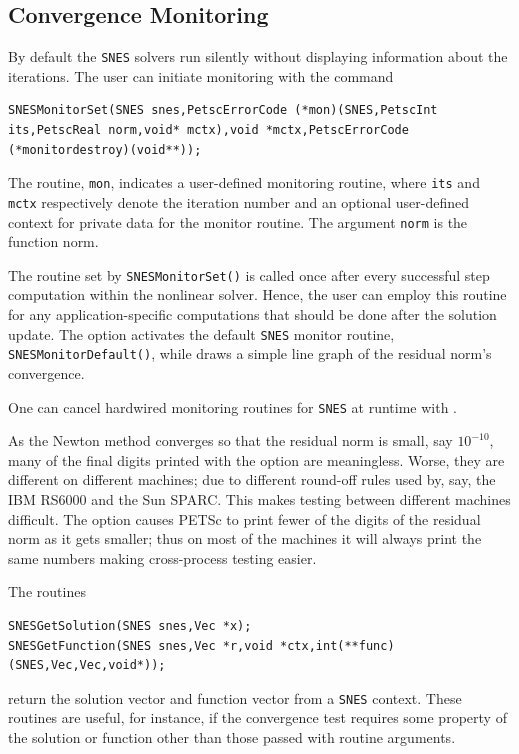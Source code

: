 \subsection{Convergence Monitoring}
\label{sec_snesmonitor}

By default the \lstinline{SNES} solvers run silently without displaying information
about the iterations. The user can initiate monitoring with the
command
\begin{lstlisting}
SNESMonitorSet(SNES snes,PetscErrorCode (*mon)(SNES,PetscInt its,PetscReal norm,void* mctx),void *mctx,PetscErrorCode (*monitordestroy)(void**));
\end{lstlisting}
The routine, \lstinline{mon}, indicates a user-defined monitoring routine,
where \lstinline{its} and \lstinline{mctx} respectively denote the iteration
number and an optional user-defined context for private data for the
monitor routine.  The argument \lstinline{norm} is the function norm.

The routine set by \lstinline{SNESMonitorSet()} is called once after every
successful step computation within the nonlinear solver.  Hence, the
user can employ this routine for any application-specific computations
that should be done after the solution update. The option
  activates the default
\lstinline{SNES} monitor routine, \lstinline{SNESMonitorDefault()},
while   draws
a simple line graph of the residual norm's convergence.

One can cancel hardwired monitoring routines for \lstinline{SNES} at runtime with
. 

As the Newton method converges so that the residual norm is small,
say $ 10^{-10} $, many of the final digits printed with the 
option are meaningless. Worse, they are different on different
machines; due to different round-off rules used by, say, the IBM RS6000
and the Sun SPARC. This makes testing between different machines
difficult. The option  
causes PETSc to print fewer of the digits of the residual norm
as it gets smaller; thus on most of the machines it will always
print the same numbers making cross-process testing easier.

The routines
\begin{lstlisting}
SNESGetSolution(SNES snes,Vec *x);
SNESGetFunction(SNES snes,Vec *r,void *ctx,int(**func)(SNES,Vec,Vec,void*));
\end{lstlisting}
return the solution vector and function vector from a \lstinline{SNES} context.
These routines are useful, for instance, if the convergence test requires
some property of the solution or function other than those passed with
routine arguments.

